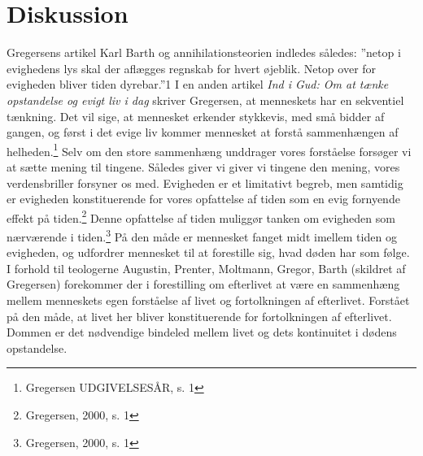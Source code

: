 \chapter{Diskussion}
Gregersens artikel Karl Barth og annihilationsteorien indledes således: ”netop i evighedens lys skal der aflægges regnskab for hvert øjeblik. Netop over for evigheden bliver tiden dyrebar.”1 I en anden artikel \textit{Ind i Gud: Om at tænke opstandelse og evigt liv i dag} skriver Gregersen, at menneskets har en sekventiel tænkning. Det vil sige, at mennesket erkender stykkevis, med små bidder af gangen, og først i det evige liv kommer mennesket at forstå sammenhængen af helheden.\footnote{Gregersen UDGIVELSESÅR, s. 1} Selv om den store sammenhæng unddrager vores forståelse forsøger vi at sætte mening til tingene. Således giver vi giver vi tingene den mening, vores verdensbriller forsyner os med. Evigheden er et limitativt begreb, men samtidig er evigheden konstituerende for vores opfattelse af tiden som en evig fornyende effekt på tiden.\footnote{Gregersen, 2000, s. 1} Denne opfattelse af tiden muliggør tanken om evigheden som nærværende i tiden.\footnote{Gregersen, 2000, s. 1} På den måde er mennesket fanget midt imellem tiden og evigheden, og udfordrer mennesket til at forestille sig, hvad døden har som følge. I forhold til teologerne Augustin, Prenter, Moltmann, Gregor, Barth (skildret af Gregersen) forekommer der i forestilling om efterlivet at være en sammenhæng mellem menneskets egen forståelse af livet og fortolkningen af efterlivet. Forstået på den måde, at livet her bliver konstituerende for fortolkningen af efterlivet. Dommen er det nødvendige bindeled mellem livet og dets kontinuitet i dødens opstandelse.

